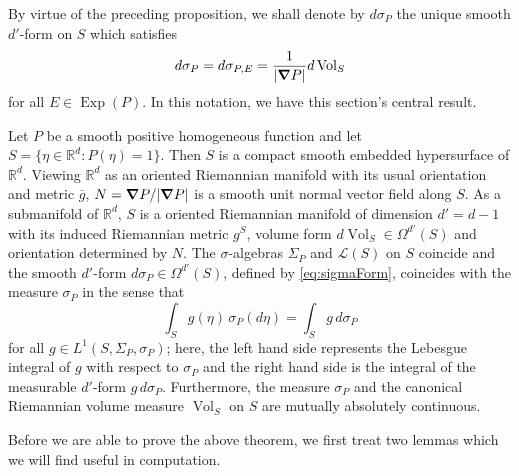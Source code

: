 \documentclass[smallextended]{svjour3}
\theoremstyle{remark}
\newcommand\Exp{\operatorname{Exp}}
\newcommand{\Vol}{\operatorname{Vol}}
\begin{document}
\noindent By virtue of the preceding proposition, we shall denote by $d\sigma_P$ the unique smooth $d'$-form on $S$ which satisfies
\begin{equation}\label{eq:sigmaForm}
    d\sigma_P=d\sigma_{P,E}=\frac{1}{|\grad P|}d\Vol_S
\end{equation}
for all $E\in\Exp(P)$. In this notation, we have this section's central result.




\begin{theorem}\label{thm:RiemannLebesgue}
Let $P$ be a smooth positive homogeneous function and let $S=\{\eta\in\mathbb{R}^d:P(\eta)=1\}$. Then $S$ is a compact smooth embedded hypersurface of $\mathbb{R}^d$. Viewing $\mathbb{R}^d$ as an oriented Riemannian manifold with its usual orientation and metric $\overline{g}$, $N=\grad P/|\grad P|$ is a smooth unit normal vector field along $S$. As a submanifold of $\mathbb{R}^d$, $S$ is a oriented Riemannian manifold of dimension $d'=d-1$ with its induced Riemannian metric $g^S$, volume form $d\Vol_S\in\Omega^{d'}(S)$ and orientation determined by $N$. The $\sigma$-algebras $\Sigma_P$ and $\mathcal{L}(S)$ on $S$ coincide and the smooth $d'$-form $d\sigma_P\in\Omega^{d'}(S)$, defined by \eqref{eq:sigmaForm}, coincides with the measure $\sigma_P$ in the sense that
\begin{equation}\label{eq:FormsAndMeasures}
\int_S g(\eta)\,\sigma_P(d\eta)=\int_S g\,d\sigma_P
\end{equation}
for all $g\in L^1(S,\Sigma_P,\sigma_P)$; here, the left hand side represents the Lebesgue integral of $g$ with respect to $\sigma_P$ and the right hand side is the integral of the measurable $d'$-form $g\, d\sigma_P$. Furthermore, the measure $\sigma_P$ and the canonical Riemannian volume measure $\Vol_S$ on $S$ are mutually absolutely continuous.
\end{theorem}

\noindent Before we are able to prove the above theorem, we first treat two lemmas which we will find useful in computation.
\end{document}
